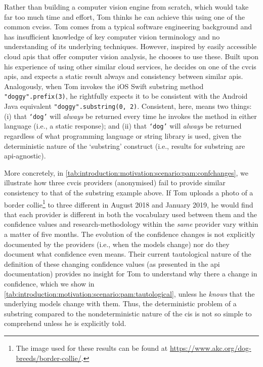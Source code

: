 Rather than building a computer vision engine from scratch, which would take far too much time and effort, Tom thinks he can achieve this using one of the common \glspl{cvcis}. Tom comes from a typical software engineering background and has insufficient knowledge of key computer vision terminology and no understanding of its underlying techniques. However, inspired by easily accessible cloud \glspl{api} that offer computer vision analysis, he chooses to use these. Built upon his experience of using other similar cloud services, he decides on one of the \gls{cvcis} \glspl{api}, and expects a static result always and consistency between similar \glspl{api}. Analogously, when Tom invokes the iOS Swift substring method \texttt{"doggy".prefix(3)}, he rightfully expects it to be consistent with the Android Java equivalent \texttt{"doggy".substring(0, 2)}. Consistent, here, means two things: (i) that \texttt{`dog'} will \textit{always} be returned every time he invokes the method in either language (i.e., a static response); and (ii) that \texttt{`dog'} will \textit{always} be returned regardless of what programming language or string library is used, given the deterministic nature of the `substring' construct (i.e., results for substring are \gls{api}-agnostic). 



More concretely, in \cref{tab:introduction:motivation:scenario:pam:confchanges}, we illustrate how three \gls{cvcis} providers (anonymised) fail to provide similar consistency to that of the substring example above. If Tom uploads a photo of a border collie\footnote{The image used for these results can be found at \url{https://www.akc.org/dog-breeds/border-collie/}.} to three different in August 2018 and January 2019, he would find that each provider is different in both the vocabulary used between them and the confidence values and research-methodology within the \textit{same} provider vary within a matter of five months. The evolution of the confidence changes is not explicitly documented by the providers (i.e., when the models change) nor do they document what confidence even means. Their current tautological nature of the definition of these changing confidence values (as presented in the \gls{api} documentation) provides no insight for Tom to understand why there a change in confidence, which we show in \cref{tab:introduction:motivation:scenario:pam:tautological}, unless he \textit{knows} that the underlying models change with them. Thus, the deterministic problem of a substring compared to the nondeterministic nature of the \gls{cis} is not so simple to comprehend unless he is explicitly told.


